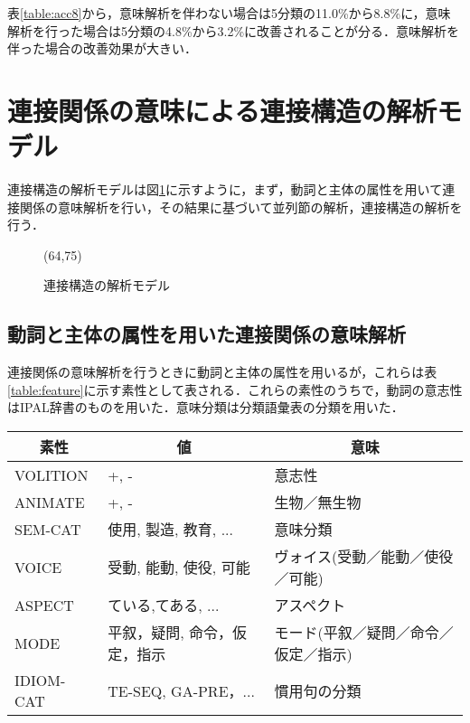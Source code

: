 表\ref{table:acc8}から，意味解析を伴わない場合は5分類の11.0\%から8.8\%に，意味解析を行った場合は5分類の4.8\%から3.2\%に改善されることが分る．意味解析を伴った場合の改善効果が大きい．

\section{連接関係の意味による連接構造の解析モデル}
連接構造の解析モデルは図\ref{fig:mocohere}に示すように，まず，動詞と主体の属性を用いて連接関係の意味解析を行い，その結果に基づいて並列節の解析，連接構造の解析を行う．

\begin{figure}
\hspace*{30mm}
\vspace*{-3mm}
\atari(64,75)
\vspace{-3mm}
\caption{連接構造の解析モデル}
\label{fig:mocohere}
\end{figure}

\subsection{動詞と主体の属性を用いた連接関係の意味解析}
連接関係の意味解析を行うときに動詞と主体の属性を用いるが，これらは表\ref{table:feature}に示す素性として表される．これらの素性のうちで，動詞の意志性はIPAL辞書\cite{ipa1987}のものを用いた．意味分類は分類語彙表\cite{nlri1989}の分類を用いた．

\begin{table*}
\caption{動詞と主体の素性}
\label{table:feature}
\begin{tabular}{| p{}|p{}| p{}|}
\hline
\multicolumn{1}{|c|}{素性} & \multicolumn{1}{|c|}{値} & \multicolumn{1}{|c|}{意味}\\
\hline
VOLITION & +, - & 意志性 \\
ANIMATE & +, - & 生物／無生物 \\
SEM-CAT & {使用, 製造, 教育}, ... & 意味分類 \\
VOICE & 受動, 能動, 使役, 可能 & ヴォイス(受動／能動／使役／可能) \\
ASPECT & {ている,てある}, ... & アスペクト \\
MODE & 平叙，疑問, 命令，仮定，指示 & モード(平叙／疑問／命令／仮定／指示) \\
IDIOM-CAT & TE-SEQ, GA-PRE，... & 慣用句の分類 \\
\hline
\end{tabular}
\end{table*}

